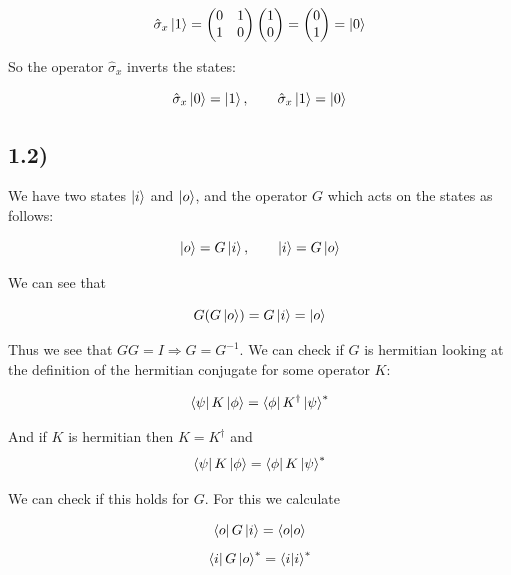 \documentclass[a4paper,norsk, 10pt]{article}
\begin{document}
\begin{equation}
\hat{\sigma}_x\ket{1} = 
\begin{pmatrix}
0 & 1\\
1 & 0
\end{pmatrix}
\begin{pmatrix}
1 \\ 0
\end{pmatrix} = 
\begin{pmatrix}
0 \\ 1
\end{pmatrix} = \ket{0}
\end{equation}

So the operator $\hat{\sigma}_x$ inverts the states:

\begin{equation}
\hat{\sigma}_x\ket{0} = \ket{1}, \qquad \hat{\sigma}_x\ket{1} = \ket{0}
\end{equation}

\subsection{1.2)}\label{sec:12}

We have two states $\ket{i}$ and $\ket{o}$, and the operator $G$ which acts on the states as follows:

\begin{equation}
\ket{o} = G\ket{i}, \qquad \ket{i} = G\ket{o}
\end{equation}

We can see that 

\begin{equation}
G(G\ket{o}) = G\ket{i} = \ket{o}
\end{equation}

Thus we see that $GG = I \Rightarrow G = G^{-1}$. We can check if $G$ is hermitian looking at the definition of the hermitian conjugate for some operator $K$:

\begin{equation}
\bra{\psi}K\ket{\phi} = \bra{\phi}K^\dagger\ket{\psi}^*
\end{equation}

And if $K$ is hermitian then $K = K^\dagger$ and
\begin{equation}
\bra{\psi}K\ket{\phi} = \bra{\phi}K\ket{\psi}^*
\end{equation}\label{eq:hermitDef}

We can check if this holds for $G$. For this we calculate

\begin{equation}
\bra{o}G\ket{i} = \braket{o}{o}
\end{equation}
\begin{equation}
\bra{i}G\ket{o}^* = \braket{i}{i}^* 
\end{equation}
\end{document}
